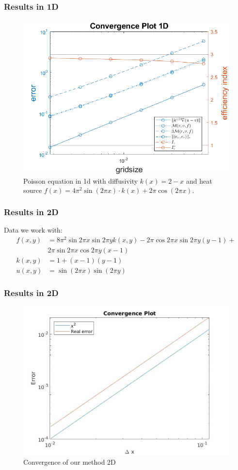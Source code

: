 \documentclass[t]{beamer}
\begin{document}
\begin{frame}
\frametitle{Results in 1D }
\vspace{-18pt}
\begin{figure}[t]
\centering
\includegraphics[width = 0.7\linewidth]{convergenceplot_k_f_non_constant.png}
\caption{Poisson equation in 1d with diffusivity $k(x) = 2-x$ and heat source $f(x) = 4\pi^2\sin(2\pi x)\cdot k(x) + 2\pi\cos(2\pi x)$.}
\label{fig:Convergence1d}
\end{figure}

\end{frame}

\begin{frame}[c]
	\frametitle{Results in 2D}
	Data we work with:
	\begin{align*}
		f(x,y) &= 8\pi^2\sin{2\pi x}\sin{2\pi y}k(x,y) - 2\pi\cos{2\pi x}\sin{2\pi y}(y-1)+ \\ &2\pi\sin{2\pi x}\cos{2\pi y}(x-1) \\
		k(x,y) &= 1 + (x-1)(y-1) \\
		u(x,y) &= \sin(2\pi x)\sin(2\pi y)
	\end{align*}
	

\end{frame}
\begin{frame}
	\frametitle{Results in 2D}
	\begin{figure}
		\centering
        \includegraphics[width = 0.7\linewidth]{../../Images/convergence2d.jpg}
		\caption{Convergence of our method 2D}
    \end{figure}
\end{frame}
\end{document}

